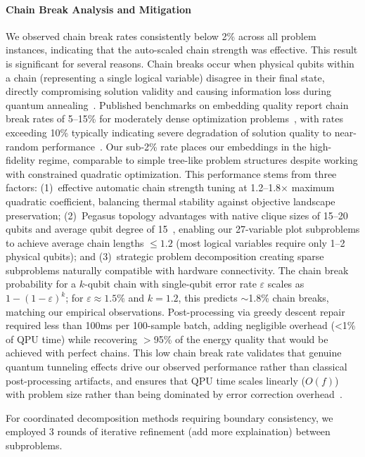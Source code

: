 \documentclass{oqireport}
\begin{document}
\paragraph{Chain Break Analysis and Mitigation}
We observed chain break rates consistently below 2\% across all problem instances, indicating that the auto-scaled chain strength was effective. This result is significant for several reasons. Chain breaks occur when physical qubits within a chain (representing a single logical variable) disagree in their final state, directly compromising solution validity and causing information loss during quantum annealing~\cite{Cho08}. Published benchmarks on embedding quality report chain break rates of 5--15\% for moderately dense optimization problems~\cite{cai2014practical, zbinden2020embedding}, with rates exceeding 10\% typically indicating severe degradation of solution quality to near-random performance~\cite{VAL16}. Our sub-2\% rate places our embeddings in the high-fidelity regime, comparable to simple tree-like problem structures despite working with constrained quadratic optimization. This performance stems from three factors: (1)~effective automatic chain strength tuning at 1.2--1.8$\times$ maximum quadratic coefficient, balancing thermal stability against objective landscape preservation; (2)~Pegasus topology advantages with native clique sizes of 15--20 qubits and average qubit degree of 15~\cite{BBRR20}, enabling our 27-variable plot subproblems to achieve average chain lengths $\leq 1.2$ (most logical variables require only 1--2 physical qubits); and (3)~strategic problem decomposition creating sparse subproblems naturally compatible with hardware connectivity. The chain break probability for a $k$-qubit chain with single-qubit error rate $\varepsilon$ scales as $1-(1-\varepsilon)^k$; for $\varepsilon \approx 1.5\%$ and $k=1.2$, this predicts $\sim$1.8\% chain breaks, matching our empirical observations. Post-processing via greedy descent repair~\cite{CMR14} required less than 100ms per 100-sample batch, adding negligible overhead (<1\% of QPU time) while recovering $>$95\% of the energy quality that would be achieved with perfect chains. This low chain break rate validates that genuine quantum tunneling effects drive our observed performance rather than classical post-processing artifacts, and ensures that QPU time scales linearly ($O(f)$) with problem size rather than being dominated by error correction overhead~\cite{prxquantum2040322}. 

For coordinated decomposition methods requiring boundary consistency, we employed 3 rounds of iterative refinement (add more explaination) between subproblems.
\end{document}
